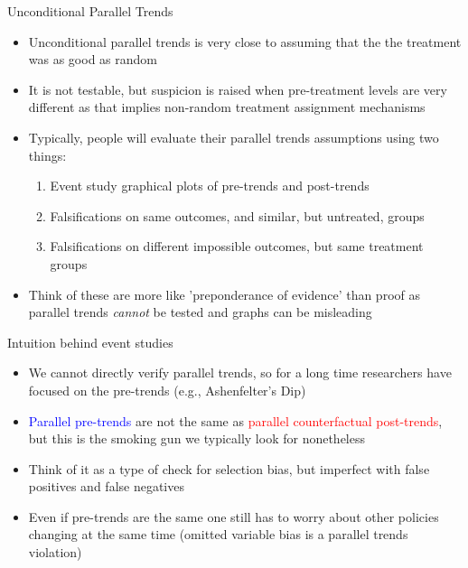 \documentclass{beamer}
\begin{document}
\begin{frame}{Unconditional Parallel Trends}

\begin{itemize}
\item Unconditional parallel trends is very close to assuming that the the treatment was as good as random
\item It is not testable, but suspicion is raised when pre-treatment levels are very different as that implies non-random treatment assignment mechanisms
\item Typically, people will evaluate their parallel trends assumptions using two things:
	\begin{enumerate}
	\item Event study graphical plots of pre-trends and post-trends
	\item Falsifications on same outcomes, and similar, but untreated, groups
	\item Falsifications on different impossible outcomes, but same treatment groups
	\end{enumerate}
\item Think of these are more like 'preponderance of evidence' than proof as parallel trends \emph{cannot} be tested and graphs can be misleading
\end{itemize}


\end{frame}



\begin{frame}{Intuition behind event studies}

\begin{itemize}

	\item We cannot directly verify parallel trends, so for a long time researchers have focused on the pre-trends (e.g., Ashenfelter's Dip)
	\item \textcolor{blue}{Parallel pre-trends} are not the same as \textcolor{red}{parallel counterfactual post-trends}, but this is the smoking gun we typically look for nonetheless
	\item Think of it as a type of check for selection bias, but imperfect with false positives and false negatives
	\item Even if pre-trends are the same one still has to worry about other policies changing at the same time (omitted variable bias is a parallel trends violation)

\end{itemize}

\end{frame}
\end{document}
